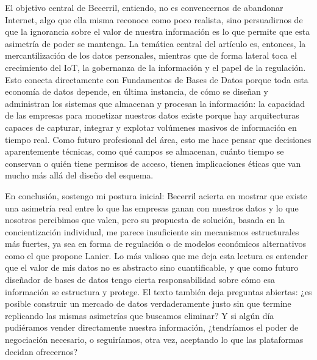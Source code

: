 El objetivo central de Becerril, entiendo, no es convencernos de abandonar Internet, algo que ella misma reconoce como poco realista, sino persuadirnos de que la ignorancia sobre el valor de nuestra información es lo que permite que esta asimetría de poder se mantenga. La temática central del artículo es, entonces, la mercantilización de los datos personales, mientras que de forma lateral toca el crecimiento del IoT, la gobernanza de la información y el papel de la regulación. Esto conecta directamente con Fundamentos de Bases de Datos porque toda esta economía de datos depende, en última instancia, de cómo se diseñan y administran los sistemas que almacenan y procesan la información: la capacidad de las empresas para monetizar nuestros datos existe porque hay arquitecturas capaces de capturar, integrar y explotar volúmenes masivos de información en tiempo real. Como futuro profesional del área, esto me hace pensar que decisiones aparentemente técnicas, como qué campos se almacenan, cuánto tiempo se conservan o quién tiene permisos de acceso, tienen implicaciones éticas que van mucho más allá del diseño del esquema.

En conclusión, sostengo mi postura inicial: Becerril acierta en mostrar que existe una asimetría real entre lo que las empresas ganan con nuestros datos y lo que nosotros percibimos que valen, pero su propuesta de solución, basada en la concientización individual, me parece insuficiente sin mecanismos estructurales más fuertes, ya sea en forma de regulación o de modelos económicos alternativos como el que propone Lanier. Lo más valioso que me deja esta lectura es entender que el valor de mis datos no es abstracto sino cuantificable, y que como futuro diseñador de bases de datos tengo cierta responsabilidad sobre cómo esa información se estructura y protege. El texto también deja preguntas abiertas: ¿es posible construir un mercado de datos verdaderamente justo sin que termine replicando las mismas asimetrías que buscamos eliminar? Y si algún día pudiéramos vender directamente nuestra información, ¿tendríamos el poder de negociación necesario, o seguiríamos, otra vez, aceptando lo que las plataformas decidan ofrecernos?
